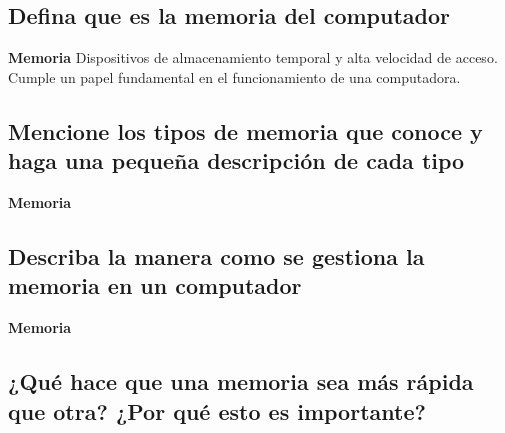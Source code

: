 \documentclass{article}
\begin{document}
\subsection{Defina que es la memoria del computador}


\begin{tcolorbox}[colupper=red!75!black]
	\textbf{Memoria}
	\tcblower
	Dispositivos de almacenamiento temporal y alta velocidad de acceso. Cumple un papel fundamental en el funcionamiento de una computadora.
\end{tcolorbox}

\subsection{Mencione los tipos de memoria que conoce y haga una pequeña descripción de cada tipo}

\begin{tcolorbox}[colupper=red!75!black]
	\textbf{Memoria}
	\tcblower
	
\end{tcolorbox}



\subsection{Describa la manera como se gestiona la memoria en un computador}

\begin{tcolorbox}[colupper=red!75!black]
	\textbf{Memoria}
	\tcblower
	
\end{tcolorbox}

\subsection{¿Qué hace que una memoria sea más rápida que otra? ¿Por qué esto es importante?}
\end{document}

